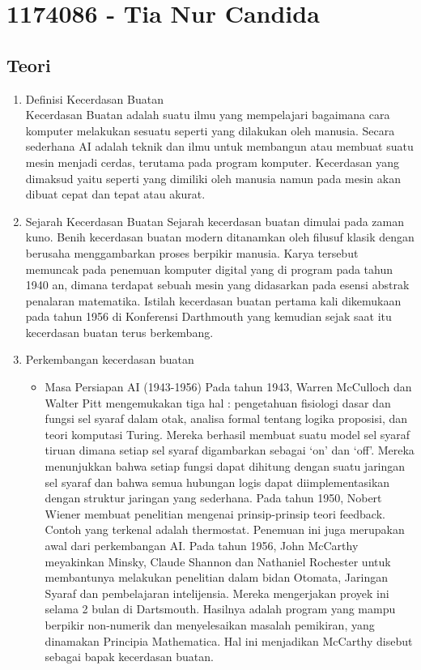 \section{1174086 - Tia Nur Candida}
\subsection{Teori}
\begin{enumerate}
\item Definisi Kecerdasan Buatan\\
Kecerdasan Buatan adalah suatu ilmu yang mempelajari bagaimana cara komputer melakukan sesuatu seperti yang dilakukan oleh manusia. Secara sederhana AI adalah teknik dan ilmu untuk membangun atau membuat suatu mesin menjadi cerdas, terutama pada program komputer. Kecerdasan yang dimaksud yaitu seperti yang dimiliki oleh manusia namun pada mesin akan dibuat cepat dan tepat atau akurat.

\item Sejarah Kecerdasan Buatan
Sejarah kecerdasan buatan dimulai pada zaman kuno. Benih kecerdasan buatan modern ditanamkan oleh filusuf klasik dengan berusaha menggambarkan proses berpikir manusia. Karya tersebut memuncak pada penemuan komputer digital yang di program pada tahun 1940 an, dimana terdapat sebuah mesin yang didasarkan pada esensi abstrak penalaran matematika. 
Istilah kecerdasan buatan pertama kali dikemukaan pada tahun 1956 di Konferensi Darthmouth yang kemudian sejak saat itu kecerdasan buatan terus berkembang.

\item Perkembangan kecerdasan buatan
\begin{itemize}
\item Masa Persiapan AI (1943-1956)
Pada tahun 1943, Warren McCulloch dan Walter Pitt mengemukakan tiga hal : pengetahuan fisiologi dasar dan fungsi sel syaraf dalam otak, analisa formal tentang logika proposisi, dan teori komputasi Turing. Mereka berhasil membuat suatu model sel syaraf tiruan dimana setiap sel syaraf digambarkan sebagai ‘on’ dan ‘off’. Mereka menunjukkan bahwa setiap fungsi dapat dihitung dengan suatu jaringan sel syaraf dan bahwa semua hubungan logis dapat diimplementasikan dengan struktur jaringan yang sederhana.
Pada tahun 1950, Nobert Wiener membuat penelitian mengenai prinsip-prinsip teori feedback. Contoh yang terkenal adalah thermostat. Penemuan ini juga merupakan awal dari perkembangan AI.
Pada tahun 1956, John McCarthy meyakinkan Minsky, Claude Shannon dan Nathaniel Rochester untuk membantunya melakukan penelitian dalam bidan Otomata, Jaringan Syaraf dan pembelajaran intelijensia. Mereka mengerjakan proyek ini selama 2 bulan di Dartsmouth. Hasilnya adalah program yang mampu berpikir non-numerik dan menyelesaikan masalah pemikiran, yang dinamakan Principia Mathematica. Hal ini menjadikan McCarthy disebut sebagai bapak kecerdasan buatan.


\end{itemize}
\end{enumerate}
